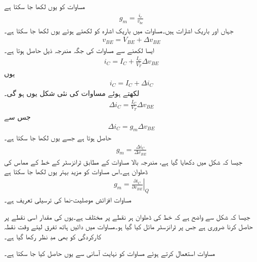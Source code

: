 
مساوات   کو یوں لکھا جا سکتا ہے
\begin{align}
g_m = \frac{i_c}{v_{be}}
\end{align}
جہاں   اور  باریک اشارات ہیں۔مساوات   میں باریک اشارہ  کو  لکھتے ہوئے یوں لکھا جا سکتا ہے۔
\begin{align}
v_{BE}=V_{BE}+\Delta v_{BE}
\end{align}
ایسا لکھنے سے مساوات   کی جگہ مندرجہ ذیل حاصل ہوتا ہے۔
\begin{align}
i_C=I_C+\frac{I_C}{V_T} \Delta v_{BE}
\end{align}
یوں
\begin{align}
i_C=I_C+\Delta i_C
\end{align}
لکھتے ہوئے مساوات   کی نئی شکل یوں ہو گی۔
\begin{align}
\Delta i_C =\frac{I_C}{V_T} \Delta v_{BE}
\end{align}
جس سے
\begin{align}
\Delta i_C = g_m \Delta v_{BE}
\end{align}
حاصل ہوتا ہے جسے یوں لکھا جا سکتا ہے۔
\begin{align}
g_m = \frac{\Delta i_C}{\Delta v_{BE}}
\end{align}
جیسا کہ شکل    میں دکھایا گیا ہے، مندرجہ بالا مساوات کے مطابق  ٹرانزسٹر کے  خط کے مماس کی ڈھلوان ہے۔اس مساوات کو مزید بہتر یوں لکھا جا سکتا ہے
\begin{align} \label{مساوات_ٹرانزسٹر_موصلیت_نما_کی_ترسیلی_تعریف}
g_m =\left . \frac{\partial i_C}{\partial v_{BE}} \right |_Q
\end{align}
مساوات   افزائش موصلیت-نما   کی ترسیلی تعریف ہے۔

جیسا کہ شکل    سے واضح ہے کہ  خط کی ڈھلوان ہر نقطے پر مختلف ہے۔یوں  کی مقدار اسی نقطے پر حاصل کرنا ضروری ہے جس پر ٹرانزسٹر مائل کیا گیا ہو۔مساوات   میں دائیں ہاتھ تفرق لیتے وقت نقطہ کارکردگی  کو بھی مدِ نظر رکھا گیا ہے۔

مساوات   استعمال کرتے ہوئے مساوات   کو نہایت آسانی سے یوں حاصل کیا جا سکتا ہے۔

